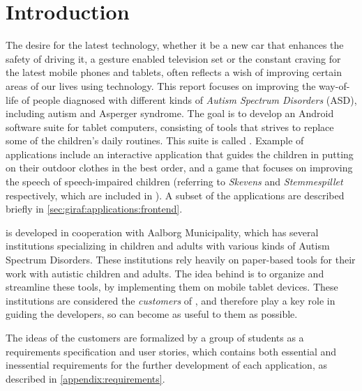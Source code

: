 \newcommand{\headerIntroduction}{Introduction}
\chapter*{\headerIntroduction}\label{chap:introduction}
\addcontentsline{toc}{chapter}{\headerIntroduction}

The desire for the latest technology, whether it be a new car that enhances the safety of driving it, a gesture enabled television set or the constant craving for the latest mobile phones and tablets, often reflects a wish of improving certain areas of our lives using technology.
This report focuses on improving the way-of-life of people diagnosed with different kinds of \textit{Autism Spectrum Disorders} (ASD), including autism and Asperger syndrome.
The goal is to develop an Android software suite for tablet computers, consisting of tools that strives to replace some of the children's daily routines. This suite is called \giraf.
Example of \giraf applications include an interactive application that guides the children in putting on their outdoor clothes in the best order, and a game that focuses on improving the speech of speech-impaired children (referring to \textit{Skevens} and \textit{Stemmespillet} respectively, which are included in \giraf).
A subset of the \giraf applications are described briefly in \cref{sec:giraf:applications:frontend}.

\giraf is developed in cooperation with Aalborg Municipality, which has several institutions specializing in children and adults with various kinds of Autism Spectrum Disorders.
These institutions rely heavily on paper-based tools for their work with autistic children and adults. 
The idea behind \giraf is to organize and streamline these tools, by implementing them on mobile tablet devices.
These institutions are considered the \textit{customers} of \giraf, and therefore play a key role in guiding the developers, so \giraf can become as useful to them as possible.

The ideas of the customers are formalized by a group of students as a requirements specification and user stories, which contains both essential and inessential requirements for the further development of each application, as described in \cref{appendix:requirements}.